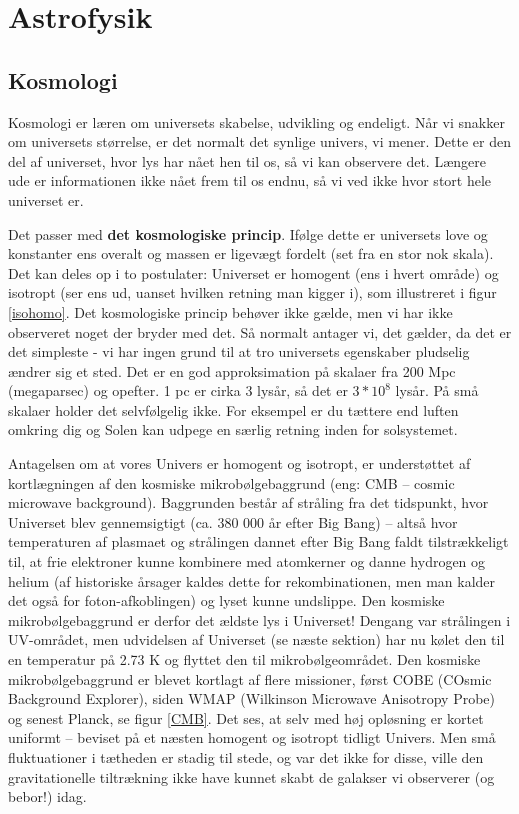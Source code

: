 \chapter{Astrofysik}
\section{Kosmologi}
Kosmologi er læren om universets skabelse, udvikling og endeligt. Når vi snakker om universets størrelse, er det normalt det synlige univers, vi mener. Dette er den del af universet, hvor lys har nået hen til os, så vi kan observere det. Længere ude er informationen ikke nået frem til os endnu, så vi ved ikke hvor stort hele universet er. 

Det passer med \textbf{det kosmologiske princip}. Ifølge dette er universets love og konstanter ens overalt og massen er ligevægt fordelt (set fra en stor nok skala). Det kan deles op i to postulater: Universet er homogent (ens i hvert område) og isotropt (ser ens ud, uanset hvilken retning man kigger i), som illustreret i figur \ref{isohomo}. Det kosmologiske princip behøver ikke gælde, men vi har ikke observeret noget der bryder med det. Så normalt antager vi, det gælder, da det er det simpleste - vi har ingen grund til at tro universets egenskaber pludselig ændrer sig et sted. Det er en god approksimation på skalaer fra 200 Mpc (megaparsec) og opefter. 1 pc er cirka 3 lysår, så det er $3*10^8$ lysår. På små skalaer holder det selvfølgelig ikke. For eksempel er du tættere end luften omkring dig og Solen kan udpege en særlig retning inden for solsystemet.

Antagelsen om at vores Univers er homogent og isotropt, er understøttet af
kortlægningen af den kosmiske mikrobølgebaggrund (eng: CMB – cosmic microwave
background). Baggrunden består af stråling fra det tidspunkt, hvor Universet blev
gennemsigtigt (ca. 380 000 år efter Big Bang) – altså hvor temperaturen af plasmaet
og strålingen dannet efter Big Bang faldt tilstrækkeligt til, at frie elektroner kunne
kombinere med atomkerner og danne hydrogen og helium (af historiske årsager
kaldes dette for rekombinationen, men man kalder det også for foton-afkoblingen)
og lyset kunne undslippe. Den kosmiske mikrobølgebaggrund er derfor det ældste
lys i Universet! Dengang var strålingen i UV-området, men udvidelsen af Universet
(se næste sektion) har nu kølet den til en temperatur på 2.73 K og flyttet den til mikrobølgeområdet. Den kosmiske mikrobølgebaggrund er blevet kortlagt af flere
missioner, først COBE (COsmic Background Explorer), siden WMAP (Wilkinson
Microwave Anisotropy Probe) og senest Planck, se figur \ref{CMB}. Det ses, at selv med høj opløsning er kortet uniformt – beviset på et næsten
homogent og isotropt tidligt Univers. Men små fluktuationer i tætheden er stadig til
stede, og var det ikke for disse, ville den gravitationelle tiltrækning ikke have kunnet
skabt de galakser vi observerer (og bebor!) idag.

